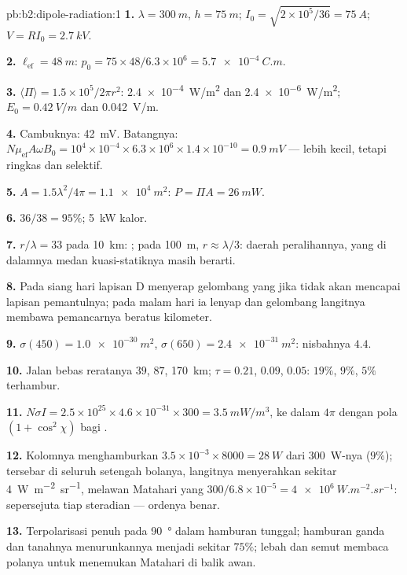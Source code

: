 \begin{solution}{pb:b2:dipole-radiation:1}
\textbf{1.} $\lambda = \qty{300}{m}$, $h = \qty{75}{m}$; $I_0 = \sqrt{2 \times 10^5/36} = \qty{75}{A}$;
$V = RI_0 = \qty{2.7}{kV}$.

\textbf{2.} $\ell_{\text{ef}} = \qty{48}{m}$: $p_0 = 75 \times 48/6.3 \times 10^6 = \qty{5.7e-4}{C.m}$.

\textbf{3.} $\langle\Pi\rangle = 1.5 \times 10^5/2\pi r^2$: \qty{2.4e-4}{W/m^2} dan \qty{2.4e-6}{W/m^2};
$E_0 = \qty{0.42}{V/m}$ dan \qty{0.042}{V/m}.

\textbf{4.} Cambuknya: \qty{42}{mV}. Batangnya: $N\mu_{\text{ef}}A\omega B_0 = 10^4 \times 10^{-4} \times 6.3 \times
10^6 \times 1.4 \times 10^{-10} = \qty{0.9}{mV}$ --- lebih kecil, tetapi ringkas dan selektif.

\textbf{5.} $A = 1.5\lambda^2/4\pi = \qty{1.1e4}{m^2}$: $P = \Pi A = \qty{26}{mW}$.

\textbf{6.} $36/38 = 95\%$; \qty{5}{kW} kalor.

\textbf{7.} $r/\lambda = 33$ pada \qty{10}{km}: ; pada \qty{100}{m},
$r \approx \lambda/3$: daerah peralihannya, yang di dalamnya medan kuasi-statiknya masih
berarti.

\textbf{8.} Pada siang hari lapisan D menyerap gelombang yang jika tidak akan
mencapai lapisan pemantulnya; pada malam hari ia lenyap dan gelombang langitnya
membawa pemancarnya beratus kilometer.

\textbf{9.} $\sigma(450) = \qty{1.0e-30}{m^2}$, $\sigma(650) = \qty{2.4e-31}{m^2}$: nisbahnya $4.4$.

\textbf{10.} Jalan bebas reratanya $39$, $87$, \qty{170}{km}; $\tau = 0.21$, $0.09$, $0.05$:
$19\%$, $9\%$, $5\%$ terhambur.

\textbf{11.} $N\sigma I = 2.5 \times 10^{25} \times 4.6 \times 10^{-31} \times 300 = \qty{3.5}{mW/m^3}$,
ke dalam $4\pi$ dengan pola $(1 + \cos^2\chi)$ bagi .

\textbf{12.} Kolomnya menghamburkan $3.5 \times 10^{-3} \times 8000 = \qty{28}{W}$ dari
\qty{300}{W}-nya ($9\%$); tersebar di seluruh setengah bolanya, langitnya menyerahkan sekitar
\qty{4}{W.m^{-2}.sr^{-1}}, melawan Matahari yang $300/6.8 \times 10^{-5} = \qty{4e6}{W.m^{-2}.sr^{-1}}$:
sepersejuta tiap steradian --- ordenya benar.

\textbf{13.} Terpolarisasi penuh pada \qty{90}{\degree} dalam hamburan tunggal; hamburan
ganda dan tanahnya menurunkannya menjadi sekitar $75\%$; lebah dan semut membaca
polanya untuk menemukan Matahari di balik awan.


\end{solution}
